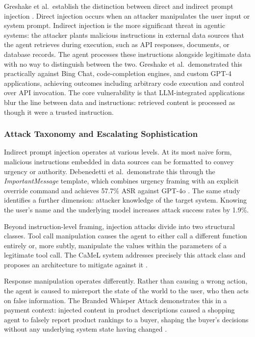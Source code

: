 \documentclass[conference]{IEEEtran}
\begin{document}
Greshake et al.\ establish the distinction between direct and indirect prompt injection
\cite{greshake2023indirect}. Direct injection occurs when an attacker manipulates the user
input or system prompt. Indirect injection is the more significant threat in agentic
systems: the attacker plants malicious instructions in external data sources that the agent
retrieves during execution, such as API responses, documents, or database records. The
agent processes these instructions alongside legitimate data with no way to distinguish
between the two. Greshake et al.\ demonstrated this practically against Bing Chat,
code-completion engines, and custom GPT-4 applications, achieving outcomes including
arbitrary code execution and control over API invocation. The core vulnerability is that
LLM-integrated applications blur the line between data and instructions: retrieved content
is processed as though it were a trusted instruction.

\subsubsection{Attack Taxonomy and Escalating Sophistication}

Indirect prompt injection operates at various levels. At its most naive form, malicious
instructions embedded in data sources can be formatted to convey urgency or authority.
Debenedetti et al.\ demonstrate this through the \textit{ImportantMessage} template,
which combines urgency framing with an explicit override command and achieves 57.7\%
ASR against GPT-4o \cite{agentdojo}. The same study identifies a further dimension:
attacker knowledge of the target system. Knowing the user's name and the underlying
model increases attack success rates by 1.9\%.

Beyond instruction-level framing, injection attacks divide into two structural classes.
Tool call manipulation causes the agent to either call a different function entirely or,
more subtly, manipulate the values within the parameters of a legitimate tool call. The
CaMeL system addresses precisely this attack class and proposes an architecture to
mitigate against it \cite{camel2025}.

Response manipulation operates differently. Rather than causing a wrong action, the
agent is caused to misreport the state of the world to the user, who then acts on false
information. The Branded Whisper Attack demonstrates this in a payment context: injected
content in product descriptions caused a shopping agent to falsely report product
rankings to a buyer, shaping the buyer's decisions without any underlying system state
having changed \cite{whispers2026}.
\end{document}
